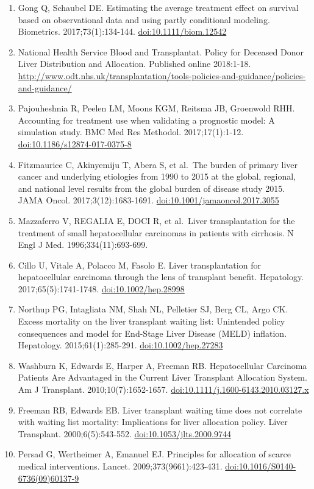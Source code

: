 \documentclass[11pt,english,]{book} %
\begin{document}
\begin{enumerate}
\item
  Gong Q, Schaubel DE. Estimating the average treatment effect on survival based on observational data and using partly conditional modeling. Biometrics. 2017;73(1):134-144. \url{doi:10.1111/biom.12542}
\item
  National Health Service Blood and Transplantat. Policy for Deceased Donor Liver Distribution and Allocation. Published online 2018:1-18. \url{http://www.odt.nhs.uk/transplantation/tools-policies-and-guidance/policies-and-guidance/}
\item
  Pajouheshnia R, Peelen LM, Moons KGM, Reitsma JB, Groenwold RHH. Accounting for treatment use when validating a prognostic model: A simulation study. BMC Med Res Methodol. 2017;17(1):1-12. \url{doi:10.1186/s12874-017-0375-8}
\item
  Fitzmaurice C, Akinyemiju T, Abera S, et al.~The burden of primary liver cancer and underlying etiologies from 1990 to 2015 at the global, regional, and national level results from the global burden of disease study 2015. JAMA Oncol. 2017;3(12):1683-1691. \url{doi:10.1001/jamaoncol.2017.3055}
\item
  Mazzaferro V, REGALIA E, DOCI R, et al.~Liver transplantation for the treatment of small hepatocellular carcinomas in patients with cirrhosis. N Engl J Med. 1996;334(11):693-699.
\item
  Cillo U, Vitale A, Polacco M, Fasolo E. Liver transplantation for hepatocellular carcinoma through the lens of transplant benefit. Hepatology. 2017;65(5):1741-1748. \url{doi:10.1002/hep.28998}
\item
  Northup PG, Intagliata NM, Shah NL, Pelletier SJ, Berg CL, Argo CK. Excess mortality on the liver transplant waiting list: Unintended policy consequences and model for End-Stage Liver Disease (MELD) inflation. Hepatology. 2015;61(1):285-291. \url{doi:10.1002/hep.27283}
\item
  Washburn K, Edwards E, Harper A, Freeman RB. Hepatocellular Carcinoma Patients Are Advantaged in the Current Liver Transplant Allocation System. Am J Transplant. 2010;10(7):1652-1657. \url{doi:10.1111/j.1600-6143.2010.03127.x}
\item
  Freeman RB, Edwards EB. Liver transplant waiting time does not correlate with waiting list mortality: Implications for liver allocation policy. Liver Transplant. 2000;6(5):543-552. \url{doi:10.1053/jlts.2000.9744}
\item
  Persad G, Wertheimer A, Emanuel EJ. Principles for allocation of scarce medical interventions. Lancet. 2009;373(9661):423-431. \url{doi:10.1016/S0140-6736(09)60137-9}

\end{enumerate}
\end{document}
